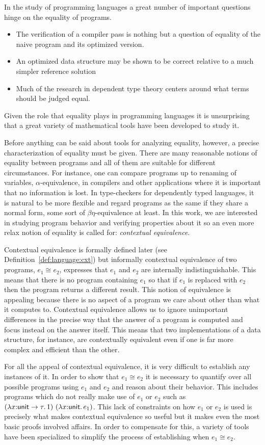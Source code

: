 In the study of programming languages a great number of important
questions hinge on the equality of programs.
\begin{itemize}
\item The verification of a compiler pass is nothing but a
  question of equality of the naive program and its optimized
  version.
\item An optimized data structure may be shown to be correct relative to a
  much simpler reference solution
\item Much of the research in dependent type theory centers around
  what terms should be judged equal.
\end{itemize}
Given the role that equality plays in programming languages it is
unsurprising that a great variety of mathematical tools have been
developed to study it.

Before anything can be said about tools for analyzing equality,
however, a precise characterization of equality must be given. There
are many reasonable notions of equality between programs and all of
them are suitable for different circumstances. For instance, one can
compare programs up to renaming of variables, $\alpha$-equivalence, in
compilers and other applications where it is important that no
information is lost. In type-checkers for dependently typed languages,
it is natural to be more flexible and regard programs as the same if
they share a normal form, some sort of $\beta\eta$-equivalence at
least. In this work, we are interested in studying program behavior
and verifying properties about it so an even more relax notion of
equality is called for: \emph{contextual equivalence}.

Contextual equivalence is formally defined later (see
Definition~\ref{def:language:cxt}) but informally contextual
equivalence of two programs, $e_1 \cong e_2$, expresses that $e_1$ and
$e_2$ are internally indistinguishable. This means that there is no
program containing $e_1$ so that if $e_1$ is replaced with $e_2$ then
the program returns a different result. This notion of equivalence is
appealing because there is no aspect of a program we care about other
than what it computes to. Contextual equivalence allows us to ignore
unimportant differences in the precise way that the answer of a
program is computed and focus instead on the answer itself. This means
that two implementations of a data structure, for instance, are
contextually equivalent even if one is far more complex and efficient
than the other.

For all the appeal of contextual equivalence, it is very difficult to
establish any instances of it. In order to show that
$e_1 \cong e_2$ it is necessary to quantify over all possible programs
using $e_1$ and $e_2$ and reason about their behavior. This includes
programs which do not really make use of $e_1$ or $e_2$ such as
$(\lambda x {:} \mathsf{unit} \to \tau.\, 1)\ (\lambda x {:} \mathsf{unit}.\, e_1)$. This lack
of constraints on how $e_1$ or $e_2$ is used is precisely what makes
contextual equivalence so useful but it makes even the most basic
proofs involved affairs. In order to compensate for this, a variety of
tools have been specialized to simplify the process of establishing when
$e_1 \cong e_2$.

